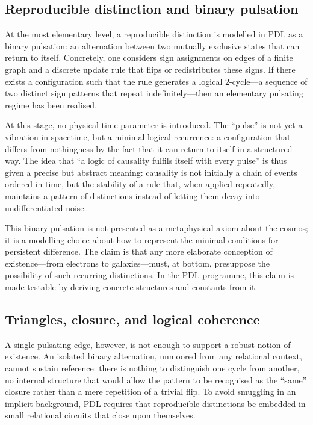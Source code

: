 \documentclass[11pt,a4paper]{article}
\theoremstyle{definition}
\begin{document}
\subsection{Reproducible distinction and binary pulsation}

At the most elementary level, a reproducible distinction is modelled in PDL as a binary pulsation: an alternation between two mutually exclusive states that can return to itself.\cite{Laubscher_IntroPDL_2024,Laubscher_Existence_PulsatingClosure_2026} Concretely, one considers sign assignments on edges of a finite graph and a discrete update rule that flips or redistributes these signs. If there exists a configuration such that the rule generates a logical \(2\)-cycle---a sequence of two distinct sign patterns that repeat indefinitely---then an elementary pulsating regime has been realised.

At this stage, no physical time parameter is introduced. The ``pulse'' is not yet a vibration in spacetime, but a minimal logical recurrence: a configuration that differs from nothingness by the fact that it can return to itself in a structured way. The idea that ``a logic of causality fulfils itself with every pulse'' is thus given a precise but abstract meaning: causality is not initially a chain of events ordered in time, but the stability of a rule that, when applied repeatedly, maintains a pattern of distinctions instead of letting them decay into undifferentiated noise.\cite{Laubscher_Existence_PulsatingClosure_2026}

This binary pulsation is not presented as a metaphysical axiom about the cosmos; it is a modelling choice about how to represent the minimal conditions for persistent difference. The claim is that any more elaborate conception of existence---from electrons to galaxies---must, at bottom, presuppose the possibility of such recurring distinctions. In the PDL programme, this claim is made testable by deriving concrete structures and constants from it.\cite{Laubscher_EmergencePhysicalReality_2024,Laubscher_PDL_GlobalMapping_v6_2024}

\subsection{Triangles, closure, and logical coherence}

A single pulsating edge, however, is not enough to support a robust notion of existence. An isolated binary alternation, unmoored from any relational context, cannot sustain reference: there is nothing to distinguish one cycle from another, no internal structure that would allow the pattern to be recognised as the ``same'' closure rather than a mere repetition of a trivial flip.\cite{Laubscher_Existence_PulsatingClosure_2026} To avoid smuggling in an implicit background, PDL requires that reproducible distinctions be embedded in small relational circuits that close upon themselves.
\end{document}
